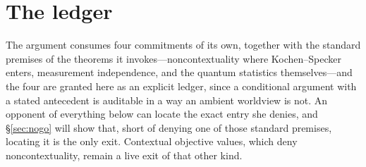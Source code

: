
\section{The ledger}\label{sec:ledger}

The argument consumes four commitments of its own, together with the standard premises of the theorems it invokes---noncontextuality where Kochen--Specker enters, measurement independence, and the quantum statistics themselves---and the four are granted here as an explicit ledger, since a conditional argument with a stated antecedent is auditable in a way an ambient worldview is not. An opponent of everything below can locate the exact entry she denies, and \S\ref{sec:nogo} will show that, short of denying one of those standard premises, locating it is the only exit. Contextual objective values, which deny noncontextuality, remain a live exit of that other kind.

